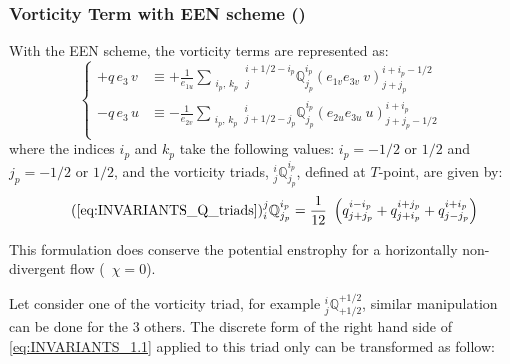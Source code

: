 \documentclass[../main/NEMO_manual]{subfiles}
\begin{document}
\subsubsection{Vorticity Term with EEN scheme (\protect{})}
\label{subsec:INVARIANTS_vorEEN}

With the EEN scheme, the vorticity terms are represented as:
\begin{equation}
  \label{eq:INVARIANTS_dynvor_een2}
  \left\{ {
      \begin{aligned}
        +q\,e_3 \, v 	&\equiv +\frac{1}{e_{1u} }   \sum_{\substack{i_p,\,k_p}}
        {^{i+1/2-i_p}_j}  \mathbb{Q}^{i_p}_{j_p}  \left( e_{1v} e_{3v} \ v  \right)^{i+i_p-1/2}_{j+j_p}   \\
        - q\,e_3 \, u     &\equiv -\frac{1}{e_{2v} }    \sum_{\substack{i_p,\,k_p}}
        {^i_{j+1/2-j_p}}  \mathbb{Q}^{i_p}_{j_p}  \left( e_{2u} e_{3u} \ u  \right)^{i+i_p}_{j+j_p-1/2}   \\
      \end{aligned}
    } \right.
\end{equation}
where the indices $i_p$ and $k_p$ take the following values:
$i_p = -1/2$ or $1/2$ and $j_p = -1/2$ or $1/2$,
and the vorticity triads, ${^i_j}\mathbb{Q}^{i_p}_{j_p}$, defined at $T$-point, are given by:
\begin{equation}
  \tag{\ref{eq:INVARIANTS_Q_triads}}
  _i^j \mathbb{Q}^{i_p}_{j_p}
  = \frac{1}{12} \ \left(   q^{i-i_p}_{j+j_p} + q^{i+j_p}_{j+i_p} + q^{i+i_p}_{j-j_p}  \right)
\end{equation}

This formulation does conserve the potential enstrophy for a horizontally non-divergent flow (\ie\ $\chi=0$).

Let consider one of the vorticity triad, for example ${^{i}_j}\mathbb{Q}^{+1/2}_{+1/2} $,
similar manipulation can be done for the 3 others.
The discrete form of the right hand side of \autoref{eq:INVARIANTS_1.1} applied to
this triad only can be transformed as follow:
\end{document}
